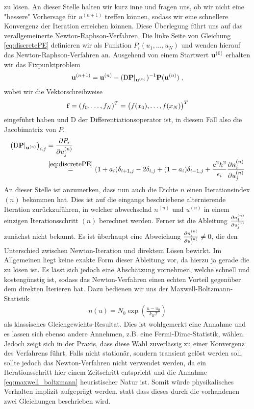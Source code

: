 zu lösen. An dieser Stelle halten wir kurz inne und fragen uns, ob wir nicht eine "bessere" Vorhersage für $u^{(n+1)}$ treffen können, sodass wir eine schnellere Konvergenz der Iteration erreichen können. Diese Überlegung führt uns auf das verallgemeinerte Newton-Raphson-Verfahren.
Die linke Seite von Gleichung \eqref{eq:discretePE} definieren wir als Funktion $P_i(u_1,\dots,u_N)$ und wenden hierauf das Newton-Raphson-Verfahren an. Ausgehend von einem Startwert $\vb{u}^{(0)}$ erhalten wir das Fixpunktproblem
\begin{align}
  \vb{u}^{(n+1)} = \vb{u}^{(n)} - (\mathrm{D}\vb{P}|_{\vb{u}^{(n)}})^{-1} \vb{P}(\vb{u}^{(n)}) \; ,
  \label{eq:fixpunkt_gummel}
\end{align}
wobei wir die Vektorschreibweise
\begin{align}
  \vb{f} = \left( f_0,\dots,f_N\right)^T = \left( f(x_0),\dots,f(x_N)\right)^T
\end{align}
eingeführt haben und $\mathrm{D}$ der Differentiationsoperator ist, in diesem Fall also die Jacobimatrix von $P$.
\begin{align}
  \left(\mathrm{D}\vb{P}|_{\vb{u}^{(n)}}\right)_{i,j} &= \frac{\mathrm{\partial}P_i}{\mathrm{\partial}u_j^{(n)}} \\ &\stackrel{\eqref{eq:discretePE}}{=}
  (1+a_i)\delta_{i+1,j} - 2 \delta_{i,j} + (1-a_i)\delta_{i-1,j} + \frac{e^2h^2}{\epsilon_i}\frac{\mathrm{\partial}n_i^{(n)}}{\mathrm{\partial}u_j^{(n)}}
\end{align}
An dieser Stelle ist anzumerken, dass nun auch die Dichte $n$ einen Iterationsindex $(n)$ bekommen hat. Dies ist auf die eingangs beschriebene alternierende Iteration zurückzuführen, in welcher abwechselnd $n^{(n)}$ und $u^{(n)}$ in einem einzigen Iterationsschritt $(n)$ berechnet werden. Ferner ist die Ableitung $\frac{\mathrm{\partial}n_i^{(n)}}{\mathrm{\partial}u_j^{(n)}}$ zunächst nicht bekannt.
Es ist überhaupt eine Abweichung $\frac{\mathrm{\partial}n_i^{(n)}}{\mathrm{\partial}u_j^{(n)}} \neq 0$, die den Unterschied zwischen Newton-Iteration und direktem Lösen bewirkt. Im Allgemeinen liegt keine exakte Form dieser Ableitung vor, da hierzu ja gerade die \lvn zu lösen ist. Es lässt sich jedoch eine Abschätzung vornehmen, welche schnell und kostengünstig ist, sodass das Newton-Verfahren einen echten Vorteil gegenüber dem direkten Iterieren hat. Dazu bedienen wir uns der Maxwell-Boltzmann-Statistik
\begin{align}
  n(u) = N_0\exp\left(\frac{u-u_0}{k_B T}\right)
  \label{eq:maxwell_boltzmann}
\end{align}
als klassisches Gleichgewichts-Resultat. Dies ist wohlgemerkt eine Annahme und es lassen sich ebenso andere Annehmen, z.B. eine Fermi-Dirac-Statistik, wählen. Jedoch zeigt sich in der Praxis, dass diese Wahl zuverlässig zu einer Konvergenz des Verfahrens führt. Falls nicht stationär, sondern transient gelöst werden soll, sollte jedoch das Newton-Verfahren nicht verwendet werden, da ein Iterationsschritt hier einem Zeitschritt entspricht und die Annahme \eqref{eq:maxwell_boltzmann} heuristischer Natur ist. Somit würde physikalisches Verhalten implizit aufgeprägt werden, statt dass dieses durch die vorhandenen zwei Gleichungen beschrieben wird.


